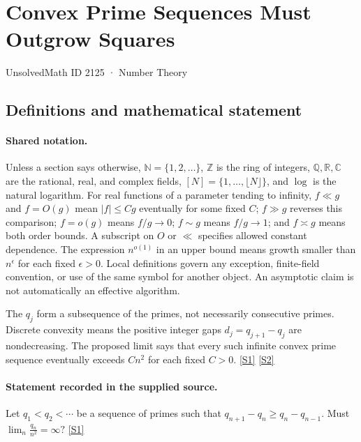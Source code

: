 \documentclass[11pt,a4paper]{article}
\newcommand{\N}{\mathbb{N}}
\newcommand{\Z}{\mathbb{Z}}
\newcommand{\Q}{\mathbb{Q}}
\newcommand{\R}{\mathbb{R}}
\newcommand{\C}{\mathbb{C}}
\newcommand{\sref}[2]{\hyperlink{source:#1:#2}{[S#2]}}
\begin{document}

\setcounter{section}{2124}

\section{Convex Prime Sequences Must Outgrow Squares}\label{2125}

{\small\sffamily UnsolvedMath ID 2125 · Number Theory}

\subsection{Definitions and mathematical statement}

\paragraph{Shared notation.}Unless a section says otherwise, $\N=\{1,2,\ldots\}$,
$\Z$ is the ring of integers, $\Q,\R,\C$ are the rational, real, and complex
fields, $[N]=\{1,\ldots,\lfloor N\rfloor\}$, and $\log$ is the natural
logarithm. For real functions of a parameter tending to infinity,
$f\ll g$ and $f=O(g)$ mean $|f|\leq Cg$ eventually for some fixed $C$;
$f\gg g$ reverses this comparison; $f=o(g)$ means $f/g\to0$;
$f\sim g$ means $f/g\to1$; and $f\asymp g$ means both order bounds.
A subscript on $O$ or $\ll$ specifies allowed constant dependence.
The expression $n^{o(1)}$ in an upper bound means growth smaller than
$n^\epsilon$ for each fixed $\epsilon>0$. Local definitions govern any
exception, finite-field convention, or use of the same symbol for another
object. An asymptotic claim is not automatically an effective algorithm.



The $q_j$ form a subsequence of the primes, not necessarily consecutive primes. Discrete convexity means the positive integer gaps $d_j=q_{j+1}-q_j$ are nondecreasing. The proposed limit says that every such infinite convex prime sequence eventually exceeds $C n^2$ for each fixed $C>0$. \sref{2125}{1} \sref{2125}{2}

\paragraph{Statement recorded in the supplied source.}
Let $q_1<q_2<\cdots$ be a sequence of primes such that $ q_{n+1}-q_n\geq q_n-q_{n-1}. $ Must $ \lim_n \frac{q_n}{n^2}=\infty? $ \sref{2125}{1}
\end{document}
